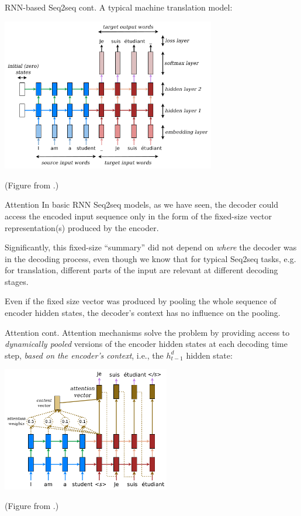 \documentclass[style=upen, size=14pt]{powerdot}
\theoremstyle{definition}
\begin{document}
\begin{slide}[toc=]{RNN-based Seq2seq cont.}
  A typical machine translation model:
    \begin{center}
    \includegraphics[width=0.7\textwidth]{figures/seq2seq_trans.eps}
    
    \footnotesize{(Figure from \cite{luong2016neural}.)}
  \end{center}
\end{slide}

\begin{slide}{Attention}
  In basic RNN Seq2seq models, as we have seen, the decoder could access the
  encoded input sequence only in the form of the fixed-size vector
  representation(s) produced by the encoder.\bigskip

  Significantly, this fixed-size ``summary'' did not depend on \emph{where} the
  decoder was in the decoding process, even though we know that for typical
  Seq2seq tasks, e.g. for translation, different parts of the input are relevant
  at different decoding stages.

  Even if the fixed size vector was produced by pooling the whole sequence of
  encoder hidden states, the decoder's context has no influence on the pooling.
\end{slide}

\begin{slide}[toc=]{Attention cont.}
  Attention mechanisms solve the problem by providing access to
  \emph{dynamically pooled} versions of the encoder hidden states at each
  decoding time step, \emph{based on the encoder's context}, i.e., the
  $h_{t-1}^d$ hidden state:
  \begin{center}
    \includegraphics[width=0.55\textwidth]{figures/seq2seq_attention}
    
    \footnotesize{(Figure from \cite{luong2016neural}.)}
  \end{center}
\end{slide}
\end{document}
